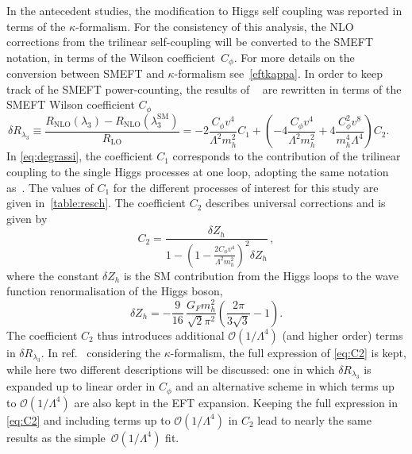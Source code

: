 	\par In the antecedent studies, the modification to Higgs self coupling was reported in terms of the $\kappa$-formalism. For the consistency of this analysis, the NLO corrections from the trilinear self-coupling will be converted to the SMEFT notation, in terms of the Wilson coefficient~$C_\phi$. For more details on the conversion between SMEFT and $\kappa$-formalism see~\autoref{eftkappa}. In order to keep track of he SMEFT power-counting, the results of ~\cite{Degrassi:2016wml} are rewritten in terms of the SMEFT Wilson coefficient $C_\phi$
	\begin{equation}
		\delta R_{\lambda_3}\equiv\frac{R_\mathrm{ NLO}(\lambda_3)-R_\mathrm{ NLO}(\lambda_3^\mathrm{{SM}})}{R_\mathrm{ LO}}=-2\frac{C_{\phi}v^4}{\Lambda^2 m_h^2}C_1 + \left(-4\frac{C_{\phi}v^4}{\Lambda^2 m_h^2}+4\frac{C_{\phi}^2 v^8}{m_h^4\Lambda^4}\right) C_2 . \;\;\;\;\;
		\label{eq:degrassi}
	\end{equation}
	In \eqref{eq:degrassi}, the coefficient $C_1$ corresponds to the contribution of the trilinear coupling to the single Higgs processes at one loop, adopting the same notation as~\cite{Degrassi:2016wml}. The values of $C_1$ for the different processes of interest for this study are given in~\autoref{table:resch}. The coefficient $C_2$ describes universal corrections and is given by
	\begin{equation}
		C_2=\frac{\delta Z_h}{1-\left(1-\frac{2 C_\phi v^4}{\Lambda^2 m_h^2}\right)^2 \delta Z_h}\,, \label{eq:C2}
	\end{equation}
	where the constant $\delta Z_h$ is the SM contribution from the Higgs loops to the wave function renormalisation of the Higgs boson,
	\begin{equation}
		\delta Z_h =-\frac{9}{16}\,\frac{G_F m_h^2}{\sqrt{2}\pi^2}\left(\frac{2\pi}{3\sqrt{3}}-1\right).
	\end{equation}
	The coefficient $C_2$ thus introduces additional $\mathcal{O}(1/\Lambda^4)$ (and higher order) terms in $\delta R_{\lambda_3}$.  
	In ref.~\cite{Degrassi:2016wml} considering the $\kappa$-formalism, the full expression of \eqref{eq:C2} is kept, while here two different descriptions will be discussed: one in which $\delta R_{\lambda_3}$ is expanded up to linear order in $C_\phi$ and an alternative scheme in which terms up to $\mathcal{O}(1/\Lambda^4)$ are also kept in the EFT expansion. Keeping the full expression in \eqref{eq:C2} and including terms up to $\mathcal{O}(1/\Lambda^4)$  in $C_2$ lead to nearly the same results as the simple~$\mathcal{O}(1/\Lambda^4)$ fit.
